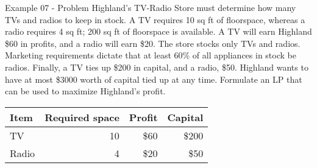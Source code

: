\begin{frame}{Example 07 - Problem}
Highland's TV-Radio Store must determine how many TVs and radios to keep in
stock. A TV requires 10 sq ft of floorspace, whereas a radio requires 4 sq ft;
200 sq ft of floorspace is available. A TV will earn Highland \$60 in profits,
and a radio will earn \$20. The store stocks only TVs and radios. Marketing
requirements dictate that at least 60\% of all appliances in stock be radios.
Finally, a TV ties up \$200 in capital, and a radio, \$50. Highland wants to
have at most \$3000 worth of capital tied up at any time. Formulate an LP that
can be used to maximize Highland's profit.

\begin{center}
\begin{tabular}{lrrr}
\hline
  \cellcolor{gray90}\textbf{Item}
& \cellcolor{gray90}\textbf{Required space}
& \cellcolor{gray90}\textbf{Profit}
& \cellcolor{gray90}\textbf{Capital} \\
\hline
TV    & 10 & \$60 & \$200 \\
Radio &  4 & \$20 &  \$50 \\
\hline
\end{tabular}
\end{center}

\end{frame}
